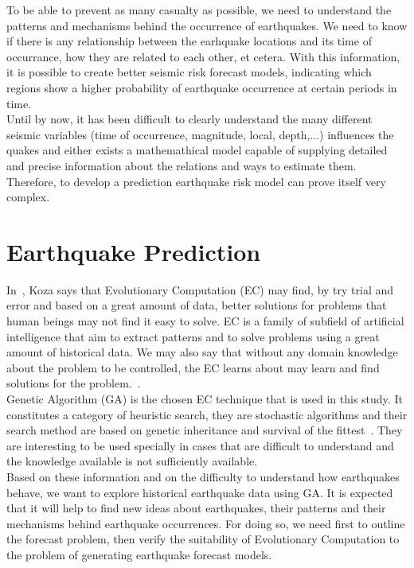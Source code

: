 To be able to prevent as many casualty as possible, we need to understand the patterns and mechanisms behind the occurrence of earthquakes. We need to know if there is any relationship between the earhquake locations and its time of occurrance, how they are related to each other, et cetera. With this information, it is possible to create better seismic risk forecast models, indicating which regions show a higher probability of earthquake occurrence at certain periods in time. \\

Until by now, it has been difficult to clearly understand the many different seismic variables (time of occurrence, magnitude, local, depth,...) influences the quakes and either exists a mathemathical model capable of supplying detailed and precise information about the relations and ways to estimate them. Therefore, to develop a prediction earthquake risk model can prove itself very complex.\\

\section{Earthquake Prediction}
In~\cite{Koza2003}, Koza says that Evolutionary Computation (EC) may find, by try trial and error and based on a great amount of data, better solutions for problems that human beings may not find it easy to solve. EC is a family of subfield of artificial intelligence that aim to extract patterns and to solve problems using a great amount of historical data. We may also say that without any domain knowledge about the problem to be controlled, the EC learns about may learn and find solutions for the problem.~\cite{Michie94machinelearning}.\\

Genetic Algorithm (GA) is the chosen EC technique that is used in this study. It constitutes a category of heuristic search, they are stochastic algorithms and their search method are based on genetic inheritance and survival of the fittest~\cite{michalewicz1996heuristic}. They are interesting to be used specially in cases that are difficult to understand and the knowledge available is not sufficiently available.\\

Based on these information and on the difficulty to understand how earthquakes behave, we want to explore historical earthquake data using GA. It is expected that it will help to find new ideas about earthquakes, their patterns and their mechanisms behind earthquake occurrences. For doing so, we need first to outline the forecast problem, then verify the suitability of Evolutionary Computation to the problem of generating earthquake forecast models.\\

